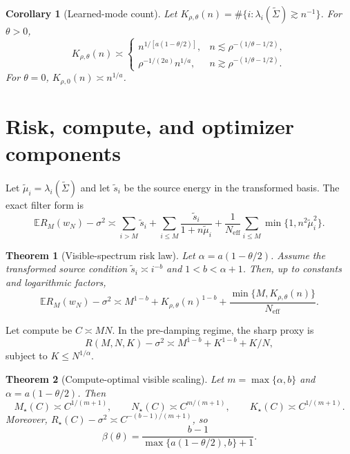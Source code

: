 \documentclass{article}
\newtheorem{theorem}{Theorem}
\newtheorem{corollary}{Corollary}
\newcommand{\E}{\mathbb{E}}
\newcommand{\tSig}{\widetilde\Sigma}
\newcommand{\tmu}{\widetilde\mu}
\newcommand{\ts}{\widetilde s}
\newcommand{\Neff}{N_{\mathrm{eff}}}
\begin{document}
\begin{corollary}[Learned-mode count]
\label{cor:learned-count}
Let $K_{\rho,\theta}(n)=\#\{i:\lambda_i(\tSig)\gtrsim n^{-1}\}$.  For $\theta>0$,
\[
    K_{\rho,\theta}(n)\asymp
    \begin{cases}
    n^{1/[a(1-\theta/2)]}, & n\lesssim \rho^{-(1/\theta-1/2)},\\[4pt]
    \rho^{-1/(2a)}n^{1/a}, & n\gtrsim \rho^{-(1/\theta-1/2)}.
    \end{cases}
\]
For $\theta=0$, $K_{\rho,0}(n)\asymp n^{1/a}$.
\end{corollary}

\section{Risk, compute, and optimizer components}
Let $\tmu_i=\lambda_i(\tSig)$ and let $\ts_i$ be the source energy in the transformed basis.  The exact filter form is
\begin{equation}
\label{eq:filters}
    \E R_M(w_N)-\sigma^2\asymp
    \sum_{i>M}\ts_i+\sum_{i\le M}\frac{\ts_i}{1+n\tmu_i}
    +\frac1{\Neff}\sum_{i\le M}\min\{1,n^2\tmu_i^2\}.
\end{equation}

\begin{theorem}[Visible-spectrum risk law]
\label{thm:risk}
Let $\alpha=a(1-\theta/2)$.  Assume the transformed source condition $\ts_i\asymp i^{-b}$ and $1<b<\alpha+1$.  Then, up to constants and logarithmic factors,
\[
    \E R_M(w_N)-\sigma^2\asymp
    M^{1-b}+K_{\rho,\theta}(n)^{1-b}
    +\frac{\min\{M,K_{\rho,\theta}(n)\}}{\Neff}.
\]
\end{theorem}

Let compute be $C\asymp MN$.  In the pre-damping regime, the sharp proxy is
\begin{equation}
\label{eq:compute-proxy}
    R(M,N,K)-\sigma^2\asymp M^{1-b}+K^{1-b}+K/N,
\end{equation}
subject to $K\le N^{1/\alpha}$.

\begin{theorem}[Compute-optimal visible scaling]
\label{thm:compute}
Let $m=\max\{\alpha,b\}$ and $\alpha=a(1-\theta/2)$.  Then
\[
    M_\star(C)\asymp C^{1/(m+1)},\qquad
    N_\star(C)\asymp C^{m/(m+1)},\qquad
    K_\star(C)\asymp C^{1/(m+1)}.
\]
Moreover, $R_\star(C)-\sigma^2\asymp C^{-(b-1)/(m+1)}$, so
\[
    \beta(\theta)=\frac{b-1}{\max\{a(1-\theta/2),b\}+1}.
\]
\end{theorem}
\end{document}
